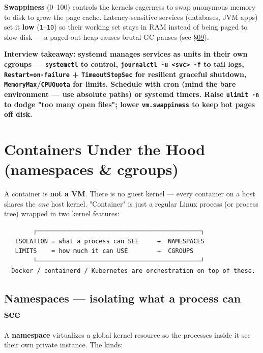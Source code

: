 \documentclass[11pt]{article}
\begin{document}
\textbf{Swappiness} (0--100) controls the kernel\textquotesingle s eagerness to swap anonymous memory to disk to grow the page cache. Latency-sensitive services (databases, JVM apps) set it \textbf{low} (\texttt{1}--\texttt{10}) so their working set stays in RAM instead of being paged to slow disk --- a paged-out heap causes brutal GC pauses (see \hyperlink{section.09}{\textcolor{acc}{§09}}).

\textbf{Interview takeaway:} \textbf{systemd manages services as units in their own cgroups --- \texttt{systemctl} to control, \texttt{journalctl\ -u\ \textless{}svc\textgreater{}\ -f} to tail logs, \texttt{Restart=on-failure} + \texttt{TimeoutStopSec} for resilient graceful shutdown, \texttt{MemoryMax}/\texttt{CPUQuota} for limits. Schedule with cron (mind the bare environment --- use absolute paths) or systemd timers. Raise \texttt{ulimit\ -n} to dodge "too many open files"; lower \texttt{vm.swappiness} to keep hot pages off disk.}

\section{Containers Under the Hood (namespaces \& cgroups)}\label{containers-under-the-hood-namespaces--cgroups}

A container is \textbf{not a VM}. There is no guest kernel --- every container on a host shares the \emph{one} host kernel. "Container" is just a regular Linux process (or process tree) wrapped in two kernel features:

\setcodelang{}

\begin{verbatim}
        ┌─────────────────────────────────────────────┐
   ISOLATION = what a process can SEE     →  NAMESPACES
   LIMITS    = how much it can USE        →  CGROUPS
        └─────────────────────────────────────────────┘
  Docker / containerd / Kubernetes are orchestration on top of these.
\end{verbatim}

\subsection{Namespaces --- isolating what a process can see}\label{namespaces--isolating-what-a-process-can-see}

A \textbf{namespace} virtualizes a global kernel resource so the processes inside it see their own private instance. The kinds:
\end{document}
